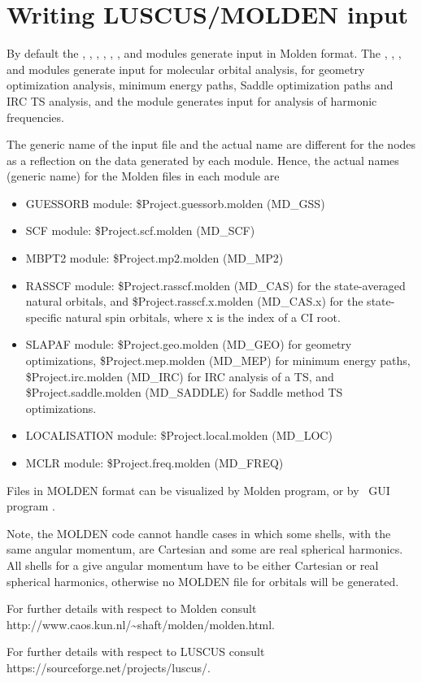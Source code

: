 
\section{Writing LUSCUS/MOLDEN input}
\label{UG:sec:Molden}
 

By default the , , , ,
, , and  modules
generate input in Molden format. The , , ,
and  modules generate input for molecular orbital
analysis,  for geometry optimization analysis, minimum energy paths,
Saddle optimization paths and IRC TS analysis,
and the  module generates input for
analysis of harmonic frequencies.

The generic name of the input file and the actual
name are different for the nodes as a reflection on the data generated
by each module. Hence, the actual names (generic name) for the Molden files in each module are
\begin{itemize}
\item GUESSORB module:
\$Project.guessorb.molden (MD\_GSS)
\item SCF module:
\$Project.scf.molden (MD\_SCF)
\item MBPT2 module:
\$Project.mp2.molden (MD\_MP2)
\item RASSCF module:
\$Project.rasscf.molden (MD\_CAS) for the state-averaged natural orbitals, and
\$Project.rasscf.x.molden (MD\_CAS.x) for the state-specific natural spin orbitals,
where x is the index of a CI root.
\item SLAPAF module:
\$Project.geo.molden (MD\_GEO) for geometry optimizations,
\$Project.mep.molden (MD\_MEP) for minimum energy paths,
\$Project.irc.molden (MD\_IRC) for IRC analysis of a TS, and
\$Project.saddle.molden (MD\_SADDLE) for Saddle method TS optimizations.
\item LOCALISATION module:
\$Project.local.molden (MD\_LOC)
\item MCLR module:
\$Project.freq.molden (MD\_FREQ)
\end{itemize}

Files in MOLDEN format can be visualized by Molden program,
or by \molcas\ GUI program . 

Note, the MOLDEN code cannot handle cases in which some shells, with the
same angular momentum,
are Cartesian and some are real spherical harmonics. All
shells for a give angular momentum have to be either Cartesian or
real spherical harmonics, otherwise no MOLDEN file for orbitals will be generated.

For further details with respect to Molden consult
http://www.caos.kun.nl/\~{}shaft/molden/molden.html.


For further details with respect to LUSCUS consult
https://sourceforge.net/projects/luscus/.


